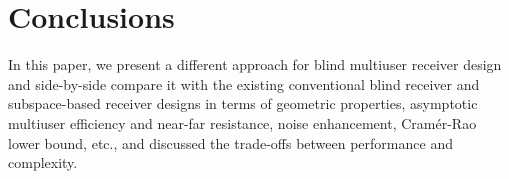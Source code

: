 \documentclass[conference]{IEEEtran}
\begin{document}
\begin{figure} \label{NFR}
\end{figure}

\section{Conclusions}
In this paper, we present a different approach for blind multiuser
receiver design and side-by-side compare it with the existing
conventional blind receiver and subspace-based receiver designs in
terms of geometric properties, asymptotic multiuser efficiency and
near-far resistance, noise enhancement, Cram\'{e}r-Rao lower
bound, etc., and discussed the trade-offs between performance and
complexity.


\end{document}
